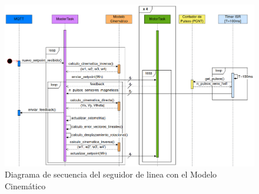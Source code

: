 \begin{figure}[H]
    \centering
    \hspace*{-1.25cm}
    \includegraphics[width=1.2\linewidth]{images/diag_secuencia_seguidor_linea_magnetica_modelo_cinem_compensado.png}
    \caption{Diagrama de secuencia del seguidor de linea con el Modelo Cinemático}
    \label{fig:diagsecuencialinefollowmodcin}
\end{figure}

